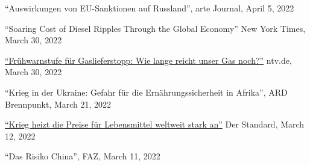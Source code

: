 \documentclass{article}
\begin{document}
\begin{minipage}[t]{0.8\textwidth}
    ``Auswirkungen von EU-Sanktionen auf Russland'', arte Journal, April 5, 2022 \par
    ``Soaring Cost of Diesel Ripples Through the Global Economy'' New York Times, March 30, 2022 \par
    \href{https://www.n-tv.de/wirtschaft/Wie-lange-reicht-unser-Gas-noch-article23234226.html}{``Frühwarnstufe für Gaslieferstopp: Wie lange reicht unser Gas noch?''} ntv.de, March 30, 2022 \par
    ``Krieg in der Ukraine: Gefahr für die Ernährungssicherheit in Afrika'', ARD Brennpunkt, March 21, 2022 \par
    \href{https://www.derstandard.de/story/2000134038874/krieg-heizt-die-preise-fuer-lebensmittel-weltweit-stark-an}{``Krieg heizt die Preise für Lebensmittel weltweit stark an''} Der Standard, March 12, 2022 \par
    ``Das Risiko China'', FAZ, March 11, 2022 \par
\end{minipage}
\medskip
\end{document}
